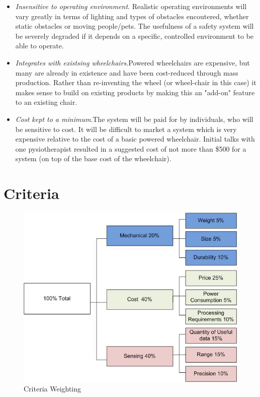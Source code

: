 \documentclass[oneside,final,a4paper]{report}
\begin{document}
\begin{itemize}
 \item \emph{Insensitive to operating environment}.  Realistic operating environments will vary greatly in terms of lighting and types of obstacles encoutered, whether static obstacles or moving people/pets. The usefulness of a safety system will be severely degraded if it depends on a specific, controlled environment to be able to operate.
 \item \emph{Integrates with existsing wheelchairs}.Powered wheelchairs are expensive, but many are already in existence and have been cost-reduced through mass production. Rather than re-inventing the wheel (or wheel-chair in this case) it makes sense to build on existing products by making this an "add-on" feature to an existing chair.

 \item \emph{Cost kept to a minimum}.The system will be paid for by individuals, who will be sensitive to cost. It will be difficult to market a system which is very expensive relative to the cost of a basic powered wheelchair. Initial talks with one pysiotherapist resulted in a suggested cost of not more than \$500 for a system (on top of the base cost of the wheelchair).
\end{itemize}

\section{Criteria}
\begin{figure}[hbt]
 \centering
 \includegraphics[scale=0.5]{CriteriaWeighting}
 \caption{Criteria Weighting} \label{fig:criteria_weighting}
\end{figure}
\end{document}

